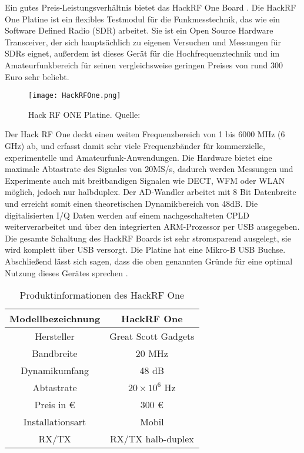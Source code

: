 Ein gutes Preis-Leistungsverhältnis bietet das HackRF One Board \cite{greatscott}. Die HackRF One Platine ist ein flexibles Testmodul für die Funkmesstechnik, das wie ein Software Defined Radio (SDR) arbeitet. Sie ist ein Open Source Hardware Transceiver, der sich hauptsächlich zu eigenen Versuchen und Messungen für SDRs eignet, außerdem ist dieses Gerät für die Hochfrequenztechnik und im Amateurfunkbereich für seinen vergleichsweise geringen Preises von rund 300 Euro sehr beliebt.\\

\begin{figure}[H]
	\centering
	\texttt{[image: HackRFOne.png]}
	\caption[Hack RF ONE Platine]{Hack RF ONE Platine. Quelle: \cite{HackRFOne:2018}} 
	\label{HackRFOne}
\end{figure}

Der Hack RF One deckt einen weiten Frequenzbereich von 1 bis 6000 MHz (6 GHz) ab, und erfasst damit sehr viele Frequenzbänder für kommerzielle, experimentelle und Amateurfunk-Anwendungen. Die Hardware bietet eine maximale Abtastrate des Signales von 20MS/s, dadurch werden Messungen und Experimente auch mit breitbandigen Signalen wie DECT, WFM oder WLAN möglich, jedoch nur halbduplex. Der AD-Wandler arbeitet mit 8 Bit Datenbreite und erreicht somit einen theoretischen Dynamikbereich von 48dB. Die digitalisierten I/Q Daten werden auf einem nachgeschalteten CPLD weiterverarbeitet und über den integrierten ARM-Prozessor per USB ausgegeben. Die gesamte Schaltung des HackRF Boards ist sehr stromsparend ausgelegt, sie wird komplett über USB versorgt. Die Platine hat eine Mikro-B USB Buchse. Abschließend lässt sich sagen, dass die oben genannten Gründe für eine optimal Nutzung dieses Gerätes sprechen \cite{wimo:2018}.\\

\begin{table}[ht]
	\centering
	\begin{tabular}{c|c}
		Modellbezeichnung & HackRF One  \\
		\hline
		Hersteller & Great Scott Gadgets\\ 
		\hline 
		Bandbreite & 20 MHz \\ 
		\hline 
		Dynamikumfang & 48 dB \\ %
		\hline 
		Abtastrate & \( 20 \times 10^{6} \) Hz \\ 
		\hline 
		Preis in \euro &  300 \euro\\ 
		\hline 
		Installationsart & Mobil \\ 
		\hline 
		RX/TX & RX/TX halb-duplex \\ 
	\end{tabular} 
	\caption{Produktinformationen des HackRF One}
\end{table}

